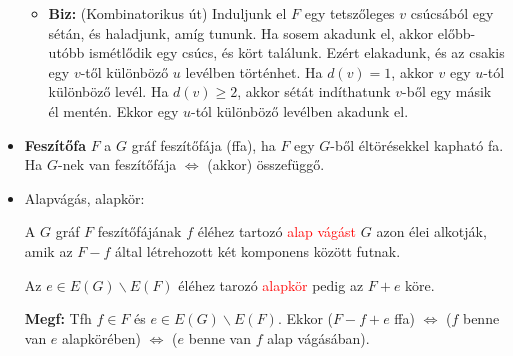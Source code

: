 \documentclass[../../szobeli.tex]{subfiles}
\begin{document}
\begin{itemize}
\begin{itemize}
            \item \textbf{Biz:} (Kombinatorikus út) Induljunk el $F$ egy tetszőleges $v$ csúcsából egy sétán, és haladjunk, amíg tununk. Ha sosem akadunk el, akkor előbb-utóbb ismétlődik egy csúcs, és kört találunk. Ezért elakadunk, és az csakis egy $v$-től különböző $u$ levélben történhet. Ha $d(v)=1$, akkor $v$ egy $u$-tól különböző levél. Ha $d(v) \geq 2$, akkor sétát indíthatunk $v$-ből egy másik él mentén. Ekkor egy $u$-tól különböző levélben akadunk el.
        \end{itemize}
        \item \textbf{Feszítőfa} $F$ a $G$ gráf feszítőfája (ffa), ha $F$ egy $G$-ből éltörésekkel kapható fa. Ha $G$-nek van feszítőfája $\Leftrightarrow$ (akkor) összefüggő.
        \item Alapvágás, alapkör: 
        
            A $G$ gráf $F$ feszítőfájának $f$ éléhez tartozó \textcolor{red}{alap vágást} $G$ azon élei alkotják, amik az $F-f$ által létrehozott két komponens között futnak. 
            
            Az $e \in E(G) \backslash E(F)$ éléhez tarozó \textcolor{red}{alapkör} pedig az $F+e$ köre.  
            
            \textbf{Megf:} Tfh $f \in F$ és $e \in E(G) \backslash E(F)$. Ekkor ($F-f+e$ ffa) $\Longleftrightarrow$ ($f$ benne van $e$ alapkörében) $\Longleftrightarrow$ ($e$ benne van $f$ alap vágásában).
    \end{itemize}
\end{document}
